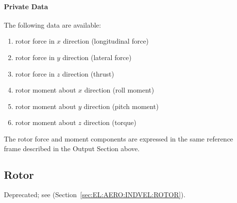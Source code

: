 \paragraph{Private Data}
The following data are available:
\begin{enumerate}
\item {} rotor force in $x$ direction (longitudinal force)
\item {} rotor force in $y$ direction (lateral force)
\item {} rotor force in $z$ direction (thrust)
\item {} rotor moment about $x$ direction (roll moment)
\item {} rotor moment about $y$ direction (pitch moment)
\item {} rotor moment about $z$ direction (torque)
\end{enumerate}
The rotor force and moment components are expressed in the same reference
frame described in the Output Section above.



\subsection{Rotor}
\label{sec:EL:AERO:ROTOR}
Deprecated; see  (Section~\ref{sec:EL:AERO:INDVEL:ROTOR}).
